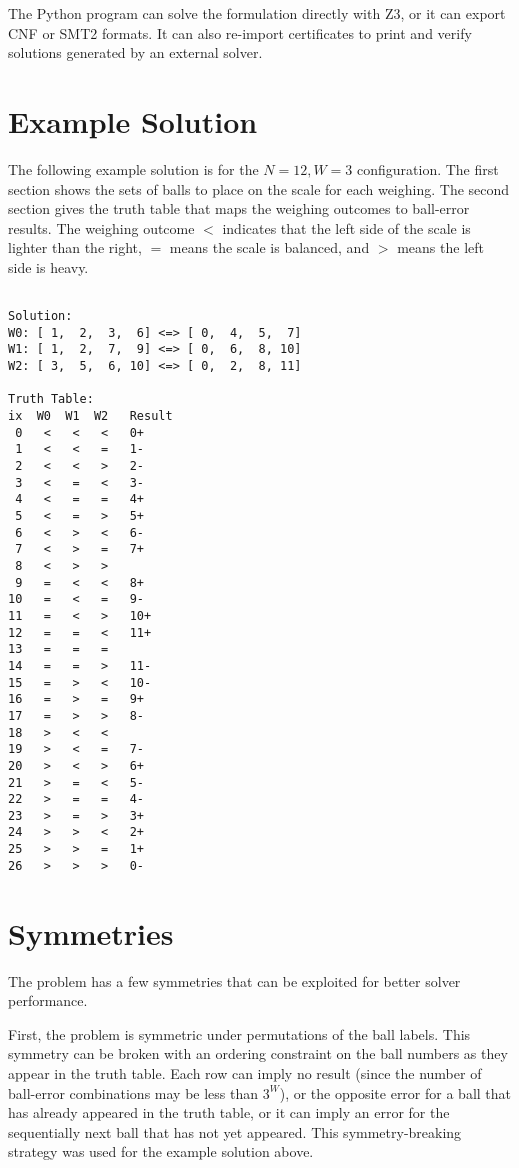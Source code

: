 \documentclass[conference]{IEEEtran}
\begin{document}
The Python program can solve the formulation directly with Z3, or it can export CNF or SMT2 formats.
It can also re-import certificates to print and verify solutions generated by an external solver.

\section{Example Solution}

The following example solution is for the $N=12, W=3$ configuration.
The first section shows the sets of balls to place on the scale for each weighing.
The second section gives the truth table that maps the weighing outcomes to ball-error results.
The weighing outcome $<$ indicates that the left side of the scale is lighter than the right,
$=$ means the scale is balanced, and $>$ means the left side is heavy.

\begin{small}
\begin{BVerbatim}

Solution:
W0: [ 1,  2,  3,  6] <=> [ 0,  4,  5,  7]
W1: [ 1,  2,  7,  9] <=> [ 0,  6,  8, 10]
W2: [ 3,  5,  6, 10] <=> [ 0,  2,  8, 11]

Truth Table:
ix  W0  W1  W2   Result
 0   <   <   <   0+
 1   <   <   =   1-
 2   <   <   >   2-
 3   <   =   <   3-
 4   <   =   =   4+
 5   <   =   >   5+
 6   <   >   <   6-
 7   <   >   =   7+
 8   <   >   >
 9   =   <   <   8+
10   =   <   =   9-
11   =   <   >   10+
12   =   =   <   11+
13   =   =   =
14   =   =   >   11-
15   =   >   <   10-
16   =   >   =   9+
17   =   >   >   8-
18   >   <   <
19   >   <   =   7-
20   >   <   >   6+
21   >   =   <   5-
22   >   =   =   4-
23   >   =   >   3+
24   >   >   <   2+
25   >   >   =   1+
26   >   >   >   0-
\end{BVerbatim}
\end{small}

\section{Symmetries}

The problem has a few symmetries that can be exploited for better solver performance.

First, the problem is symmetric under permutations of the ball labels.
This symmetry can be broken with an ordering constraint on the ball numbers as they appear in the truth table.
Each row can imply no result (since the number of ball-error combinations may be less than $3^W$),
or the opposite error for a ball that has already appeared in the truth table, or it can imply an error
for the sequentially next ball that has not yet appeared.
This symmetry-breaking strategy was used for the example solution above.
\end{document}
